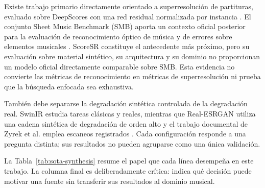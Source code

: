 Existe trabajo primario directamente orientado a superresolución de partituras, evaluado sobre
DeepScores con una red residual normalizada por instancia \cite{tran2019scoresr}. El conjunto Sheet
Music Benchmark (SMB) aporta un contexto oficial posterior para la evaluación de reconocimiento
óptico de música y de errores sobre elementos musicales
\cite{martinez2025smb,smbDatasetCard}. ScoreSR constituye el antecedente más próximo, pero su
evaluación sobre material sintético, su arquitectura y su dominio no proporcionan un modelo oficial
directamente comparable sobre SMB. Esta evidencia no
convierte las métricas de reconocimiento en métricas de superresolución ni prueba que la búsqueda
enfocada sea exhaustiva.

También debe separarse la degradación sintética controlada de la degradación real. SwinIR estudia
tareas clásicas y reales, mientras que Real-ESRGAN utiliza una cadena sintética de degradación de
orden alto y el trabajo documental de Zyrek et al. emplea escaneos registrados
\cite{liang2021swinir,wang2021realesrgan,zyrek2025document}. Cada configuración responde a una
pregunta distinta; sus resultados no pueden agruparse como una única validación.

La Tabla~\ref{tab:sota-synthesis} resume el papel que cada línea desempeña en este trabajo. La
columna final es deliberadamente crítica: indica qué decisión puede motivar una fuente sin
transferir sus resultados al dominio musical.

